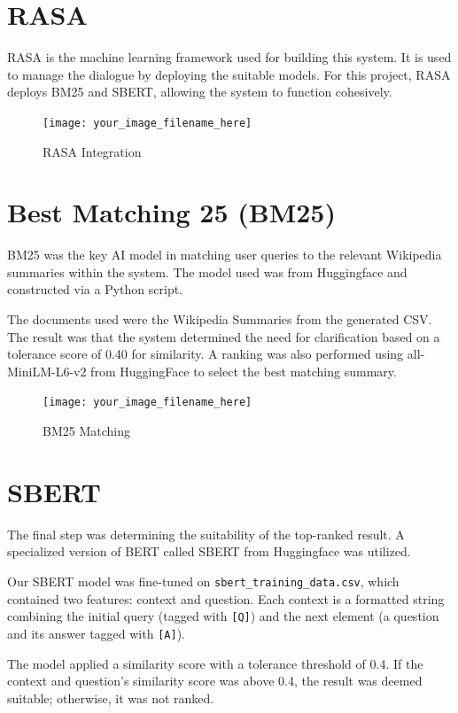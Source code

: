 \documentclass[11pt]{article}
\begin{document}
\section{RASA}
RASA is the machine learning framework used for building this system. It is used to manage the dialogue by deploying the suitable models. For this project, RASA deploys BM25 and SBERT, allowing the system to function cohesively.

\begin{figure}[h]
    \centering
    \texttt{[image: your\_image\_filename\_here]}
    \caption{RASA Integration}
    \label{fig:rasa_integration}
\end{figure}

\section{Best Matching 25 (BM25)}
BM25 was the key AI model in matching user queries to the relevant Wikipedia summaries within the system. The model used was from Huggingface and constructed via a Python script. 

The documents used were the Wikipedia Summaries from the generated CSV. The result was that the system determined the need for clarification based on a tolerance score of 0.40 for similarity. A ranking was also performed using all-MiniLM-L6-v2 from HuggingFace to select the best matching summary.

\begin{figure}[h]
    \centering
    \texttt{[image: your\_image\_filename\_here]}
    \caption{BM25 Matching}
    \label{fig:bm25_matching}
\end{figure}

\section{SBERT}
The final step was determining the suitability of the top-ranked result. A specialized version of BERT called SBERT from Huggingface was utilized.

Our SBERT model was fine-tuned on \texttt{sbert\_training\_data.csv}, which contained two features: context and question. Each context is a formatted string combining the initial query (tagged with \texttt{[Q]}) and the next element (a question and its answer tagged with \texttt{[A]}).

The model applied a similarity score with a tolerance threshold of 0.4. If the context and question's similarity score was above 0.4, the result was deemed suitable; otherwise, it was not ranked.
\end{document}
